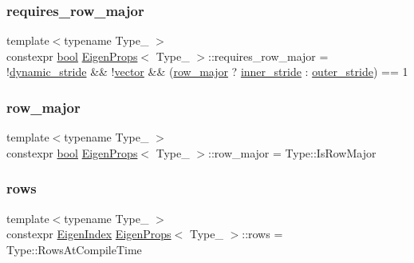 \subsubsection{\texorpdfstring{requires\_row\_major}{requires\_row\_major}}
{\footnotesize\ttfamily template$<$typename Type\+\_\+ $>$ \\
constexpr \mbox{\hyperlink{asdl_8h_af6a258d8f3ee5206d682d799316314b1}{bool}} \mbox{\hyperlink{struct_eigen_props}{Eigen\+Props}}$<$ Type\+\_\+ $>$\+::requires\+\_\+row\+\_\+major = !\mbox{\hyperlink{struct_eigen_props_a32861acd4f8d759619f7a3438a5a56a4}{dynamic\+\_\+stride}} \&\& !\mbox{\hyperlink{struct_eigen_props_a6c26ad4c67abd91b08285b63afed9ab9}{vector}} \&\& (\mbox{\hyperlink{struct_eigen_props_a290ebf6baed2dca134f928c13dda4030}{row\+\_\+major}} ? \mbox{\hyperlink{struct_eigen_props_aadd1cceef220ef97abe8eb74f1f78ecd}{inner\+\_\+stride}} \+: \mbox{\hyperlink{struct_eigen_props_ac31d9e8cc3baff0f804000486c35759d}{outer\+\_\+stride}}) == 1\hspace{0.3cm}{\ttfamily [static]}}

\mbox{\label{struct_eigen_props_a290ebf6baed2dca134f928c13dda4030}} 
\subsubsection{\texorpdfstring{row\_major}{row\_major}}
{\footnotesize\ttfamily template$<$typename Type\+\_\+ $>$ \\
constexpr \mbox{\hyperlink{asdl_8h_af6a258d8f3ee5206d682d799316314b1}{bool}} \mbox{\hyperlink{struct_eigen_props}{Eigen\+Props}}$<$ Type\+\_\+ $>$\+::row\+\_\+major = Type\+::\+Is\+Row\+Major\hspace{0.3cm}{\ttfamily [static]}}

\mbox{\label{struct_eigen_props_a2f00028920ef3138640e602c80ff9a0d}} 
\subsubsection{\texorpdfstring{rows}{rows}}
{\footnotesize\ttfamily template$<$typename Type\+\_\+ $>$ \\
constexpr \mbox{\hyperlink{eigen_8h_a4e595ab182718d84a409dd05e0829bdd}{Eigen\+Index}} \mbox{\hyperlink{struct_eigen_props}{Eigen\+Props}}$<$ Type\+\_\+ $>$\+::rows = Type\+::\+Rows\+At\+Compile\+Time\hspace{0.3cm}{\ttfamily [static]}}

